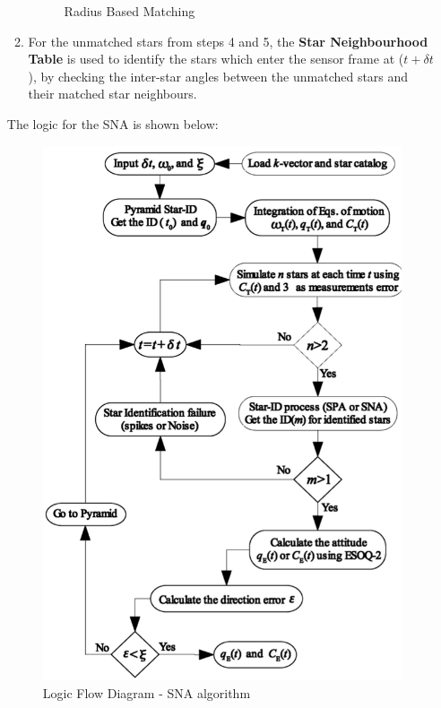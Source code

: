 \documentclass[../../main.tex]{subfiles}
\begin{document}
\begin{itemize}
\begin{enumerate}
\begin{figure}[!h]
        \caption{Radius Based Matching}
        \label{fig:radius_based_sna}
        \end{figure}
        \item For the unmatched stars from steps 4 and 5, the \textbf{Star Neighbourhood Table} is used to identify the stars which enter the sensor frame at ($t+\delta t$), by checking the inter-star angles between the unmatched stars and their matched star neighbours. 
    \end{enumerate}
    The logic for the SNA is shown below:
    \begin{figure}[!h]
        \centering
        \includegraphics[scale=0.5]{Figures/GNC/sna_flowchart.png}
        \caption{Logic Flow Diagram - SNA algorithm}
        \label{fig:sna_flowchart}
    \end{figure}
\end{itemize}
\end{document}
